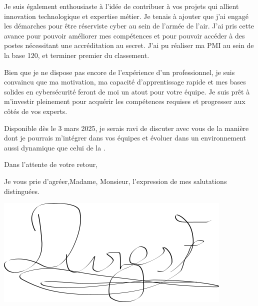 \documentclass[letterpaper,10pt]{article}
\begin{document}
{\begin{large}
\begin{justify}
Je suis également enthousiaste à l’idée de contribuer à vos projets qui allient innovation technologique et expertise métier. Je tenais à ajouter que j'ai engagé les démarches pour être réserviste cyber au sein de l'armée de l'air. J'ai pris cette avance pour pouvoir améliorer mes compétences et pour pouvoir accéder à des postes nécessitant une accréditation au secret. J'ai pu réaliser ma PMI au sein de la base 120, et terminer premier du classement.\medbreak 

Bien que je ne dispose pas encore de l’expérience d'un professionnel, je suis convaincu que ma motivation, ma capacité d’apprentissage rapide et mes bases solides en cybersécurité feront de moi un atout pour votre équipe. Je suis prêt à m’investir pleinement pour acquérir les compétences requises et progresser aux côtés de vos experts. \medbreak 

Disponible dès le 3 mars 2025, je serais ravi de discuter avec vous de la manière dont je pourrais m’intégrer dans vos équipes et évoluer dans un environnement aussi dynamique que celui de la \entreprise. \medbreak

Dans l’attente de votre retour, \medbreak

Je vous prie d’agréer,\medbreak Madame, Monsieur, l’expression de mes salutations distinguées.



\raggedleft
\fullName\smallbreak
\includegraphics[scale=0.3]{sign.png}

\end{justify}
\end{large}
}
\end{document}
